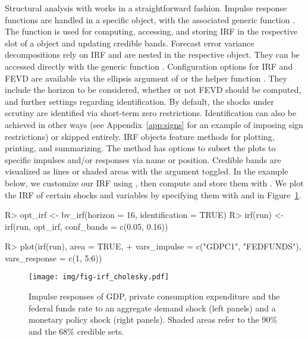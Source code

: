 \documentclass[article,nojss]{jss} %
\begin{document}
Structural analysis with  works in a straightforward fashion. Impulse response functions are handled in a specific object, with the associated generic function . The function is used for computing, accessing, and storing IRF in the respective slot of a  object and updating credible bands.
Forecast error variance decompositions rely on IRF and are nested in the respective object. They can be accessed directly with the generic function .
Configuration options for IRF and FEVD are available via the ellipsis argument of  or the helper function . They include the horizon to be considered, whether or not FEVD should be computed, and further settings regarding identification. By default, the shocks under scrutiny are identified via short-term zero restrictions. Identification can also be achieved in other ways (see Appendix~\ref{app:signs} for an example of imposing sign restrictions) or skipped entirely.
IRF objects feature methods for plotting, printing, and summarizing. The  method has options to subset the plots to specific impulses and/or responses via name or position. Credible bands are visualized as lines or shaded areas with the  argument toggled.
In the example below, we customize our IRF using , then compute and store them with . We plot the IRF of certain shocks and variables by specifying them with  and  in Figure~\ref{fig:irf_cholesky}.

\begin{Schunk}
\begin{Sinput}
R> opt_irf <- bv_irf(horizon = 16, identification = TRUE)
R> irf(run) <- irf(run, opt_irf, conf_bands = c(0.05, 0.16))
\end{Sinput}
\end{Schunk}
\begin{Schunk}
\begin{Sinput}
R> plot(irf(run), area = TRUE,
+    vars_impulse = c("GDPC1", "FEDFUNDS"), vars_response = c(1, 5:6))
\end{Sinput}
\end{Schunk}

\begin{figure}[ht]
  \centering
  \texttt{[image: img/fig-irf\_cholesky.pdf]}
  \caption{Impulse responses of GDP, private consumption expenditure and the federal funds rate to an aggregate demand shock (left panels) and a monetary policy shock (right panels). Shaded areas refer to the 90\% and the 68\% credible sets.}
  \label{fig:irf_cholesky}
\end{figure}
\end{document}
